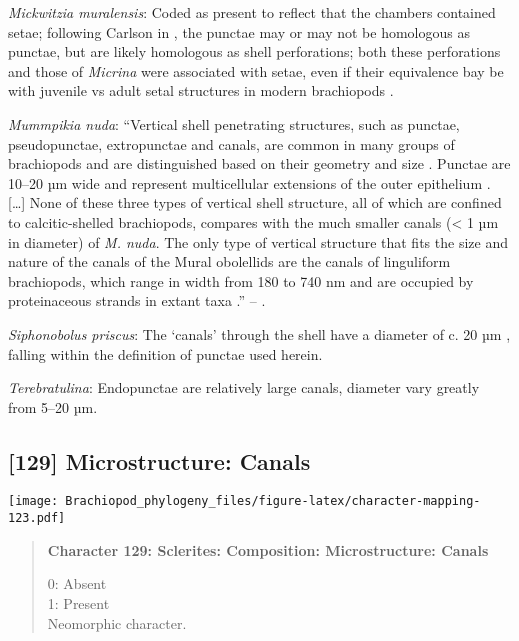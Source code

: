 \documentclass[openany]{book}
\theoremstyle{definition}
\theoremstyle{definition}
\theoremstyle{definition}
\theoremstyle{remark}
\begin{document}
\hypertarget{Mickwitzia_muralensis-coding-128}{}
\emph{Mickwitzia muralensis}: Coded as present to reflect that the
chambers contained setae; following Carlson in
\citet{Williams2007Supplement}, the punctae may or may not be homologous
as punctae, but are likely homologous as shell perforations; both these
perforations and those of \emph{Micrina} were associated with setae,
even if their equivalence bay be with juvenile vs adult setal structures
in modern brachiopods \citep[p.~397]{Balthasar2004Shellstructure}.

\hypertarget{Mummpikia_nuda-coding-128}{}
\emph{Mummpikia nuda}: ``Vertical shell penetrating structures, such as
punctae, pseudopunctae, extropunctae and canals, are common in many
groups of brachiopods and are distinguished based on their geometry and
size \citep{Williams1997Introduction}. Punctae are 10--20 µm wide and
represent multicellular extensions of the outer epithelium
\citep{Owen1969Thecaecum}. {[}\ldots{}{]} None of these three types of
vertical shell structure, all of which are confined to calcitic-shelled
brachiopods, compares with the much smaller canals (\textless{} 1 µm in
diameter) of \emph{M. nuda}. The only type of vertical structure that
fits the size and nature of the canals of the Mural obolellids are the
canals of linguliform brachiopods, which range in width from 180 to 740
nm and are occupied by proteinaceous strands in extant taxa
\citetext{\citealp[1994]{Williams1992Structureof}; \citealp{Williams1997Introduction}}.''
-- \citet{Balthasar2008iMummpikia}.

\hypertarget{Siphonobolus_priscus-coding-128}{}
\emph{Siphonobolus priscus}: The `canals' through the shell have a
diameter of c. 20 µm \citep[text-fig. 2a]{Williams2004Chemicostructure},
falling within the definition of punctae used herein.

\hypertarget{Terebratulina-coding-128}{}
\emph{Terebratulina}: Endopunctae are relatively large canals, diameter
vary greatly from 5--20 µm.

\subsection*{{[}129{]} Microstructure:
Canals}\label{microstructure-canals}

\texttt{[image: Brachiopod\_phylogeny\_files/figure-latex/character-mapping-123.pdf]}

\begin{quote}
\textbf{Character 129: Sclerites: Composition: Microstructure: Canals}

0: Absent\\
1: Present\\
Neomorphic character.
\end{quote}
\end{document}
